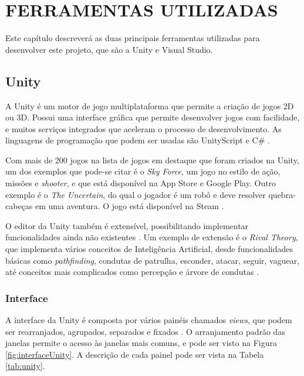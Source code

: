 \documentclass[
	12pt,					%
	openright,				%
	oneside,				%
	a4paper,				%
	bibjustif,				%
	chapter=TITLE,			%
	english,				%
	brazil,					%
	]{abntex2}
\begin{document}
\FloatBarrier
\newpage %
\chapter{FERRAMENTAS UTILIZADAS}

	Este capítulo descreverá as duas principais ferramentas utilizadas para desenvolver este projeto,
	que são a Unity e Visual Studio.

	\FloatBarrier
	\section{Unity}
		A Unity é um motor de jogo multiplataforma que permite a criação de jogos 2D ou 3D.
		Possui uma interface gráfica que permite desenvolver jogos com facilidade,
		e muitos serviços integrados que aceleram o processo de desenvolvimento.
		As linguagens de programação que podem ser usadas são UnityScript e C\#
		\cite{unitySite}.
		
		Com mais de 200 jogos na lista de jogos em destaque que foram criados na Unity,
		um dos exemplos que pode-se citar é o \textit{Sky Force},
		um jogo no estilo de ação, missões e \textit{shooter},
		e que está disponível na App Store e Google Play.
		Outro exemplo é o \textit{The Uncertain},
		do qual o jogador é um robô e
		deve resolver quebra-cabeças em uma aventura.
		O jogo está disponível na Steam
		\cite{unityGames}.
		
		O editor da Unity também é extensível, possibilitando implementar funcionalidades ainda não existentes
		\cite{unitySite}.
		Um exemplo de extensão é o \textit{Rival Theory},
		que implementa vários conceitos de Inteligência Artificial,
		desde funcionalidades básicas como \textit{pathfinding},
		condutas de patrulha, esconder, atacar, seguir, vaguear,
		até conceitos mais complicados como percepção e árvore de condutas
		\cite{rivalTheory}.
		
		\FloatBarrier
		\subsection{Interface}
			A interface da Unity é composta por vários painéis chamados \textit{views},
			que podem ser rearranjados, agrupados, separados e fixados
			\cite{unityInterface}.
			O arranjamento padrão das janelas permite o acesso às janelas mais comuns,
			e pode ser visto na Figura \ref{fig:interfaceUnity}.
			A descrição de cada painel pode ser vista na Tabela \ref{tab:unity}.
			
\end{document}
